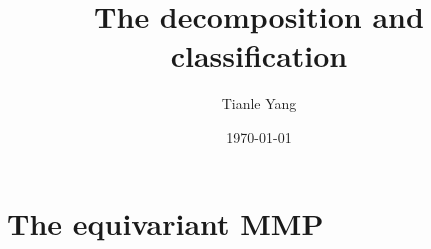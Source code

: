 \documentclass[sectionlevel=chapter,status=draft]{noteformyself}
\title{The decomposition and classification}
\author{Tianle Yang}
\date{\today}
\begin{document}
\maketitle

\tableofcontents

    \section[
      status=draft,
      tag=00000,
      label=\labelNFM{sec:the-decomposition-and-classification:the-equivariant-mmp}
    ]{The equivariant MMP}
    

\printbibliography[heading=bibintoc, title={References}]
\end{document}
